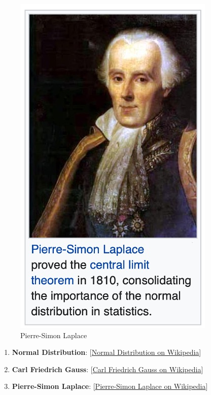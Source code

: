 \documentclass[
  12 pt,
  a4paper,
]{book}
\numberwithin{equation}{section}
\theoremstyle{plain}      %
\theoremstyle{definition} %
\theoremstyle{remark}     %
\theoremstyle{note}         %
\begin{document}
\begin{figure}[H]
\begin{minipage}[t]{0.40\textwidth}
        \includegraphics[width=\textwidth, height=0.3\textheight]{pictures/laplace.jpeg}
        \caption{Pierre-Simon Laplace}
    \end{minipage}

    \label{fig:normal-distribution-layout}
\end{figure}

\begin{enumerate}
\def\labelenumi{\arabic{enumi}.}
\item
  \textbf{Normal Distribution}:
  {[}\href{https://en.wikipedia.org/wiki/Normal_distribution}{Normal Distribution on Wikipedia}{]}
\item
  \textbf{Carl Friedrich Gauss}:
  {[}\href{https://en.wikipedia.org/wiki/Carl_Friedrich_Gauss}{Carl Friedrich Gauss on Wikipedia}{]}
\item
  \textbf{Pierre-Simon Laplace}:
  {[}\href{https://en.wikipedia.org/wiki/Pierre-Simon_Laplace}{Pierre-Simon Laplace on Wikipedia}{]}
  \newpage
\end{enumerate}
\end{document}
